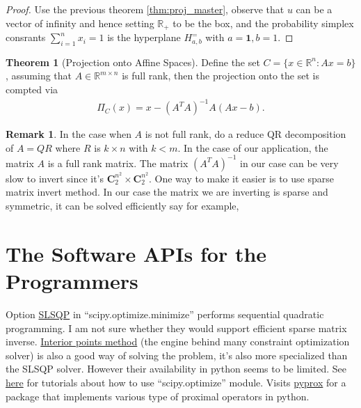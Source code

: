 \documentclass[11pt]{article}
\theoremstyle{definition}
\newtheorem{theorem}{Theorem}       %
\newtheorem{remark}{Remark}[subsection]
{
    \newtheorem{assumption}{Assumption}
}
\numberwithin{equation}{subsection}
\begin{document}
        \begin{proof}
            Use the previous theorem \ref*{thm:proj_master}, observe that $u$ can be a vector of infinity and hence setting $\mathbb R_+$ to be the box, and the probability simplex consrants $\sum_{i = 1}^{n}x_i = 1$ is the hyperplane $H_{a, b}^=$ with $a = \mathbf 1, b = 1$. 
        \end{proof}
        \begin{theorem}[Projection onto Affine Spaces]
            Define the set $C = \{x\in \mathbb R^n : Ax = b\}$, assuming that $A\in \mathbb R^{m\times n}$ is full rank, then the projection onto the set is compted via 
            \begin{align*}
                \Pi_{C}(x) = x - (A^TA)^{-1}A(Ax - b). 
            \end{align*}
        \end{theorem}
        \begin{remark}
            In the case when $A$ is not full rank, do a reduce QR decomposition of $A = Q R$ where $R$ is $k\times n$ with $k < m$. 
            In the case of our application, the matrix $A$ is a full rank matrix. 
            The matrix $(A^TA)^{-1}$ in our case can be very slow to invert since it's $\mathbf C^{n^2}_2 \times \mathbf C^{n^2}_2$. 
            One way to make it easier is to use sparse matrix invert method. 
            In our case the matrix we are inverting is sparse and symmetric, it can be solved efficiently say for example, 
        \end{remark}
\section{The Software APIs for the Programmers}
    Option \href{https://docs.scipy.org/doc/scipy/reference/optimize.minimize-slsqp.html}{SLSQP} in ``scipy.optimize.minimize'' performs sequential quadratic programming. 
    I am not sure whether they would support efficient sparse matrix inverse. 
    \href{https://en.wikipedia.org/wiki/Interior-point_method}{Interior points method} (the engine behind many constraint optimization solver) is also a good way of solving the problem, it's also more specialized than the SLSQP solver. 
    However their availability in python seems to be limited.
    See \href{https://docs.scipy.org/doc/scipy/tutorial/optimize.html}{here} for tutorials about how to use ``scipy.optimize'' module. 
    Visits \href{https://pyproximal.readthedocs.io/en/stable/tutorials/index.html}{pyprox} for a package that implements various type of proximal operators in python.
\end{document}

